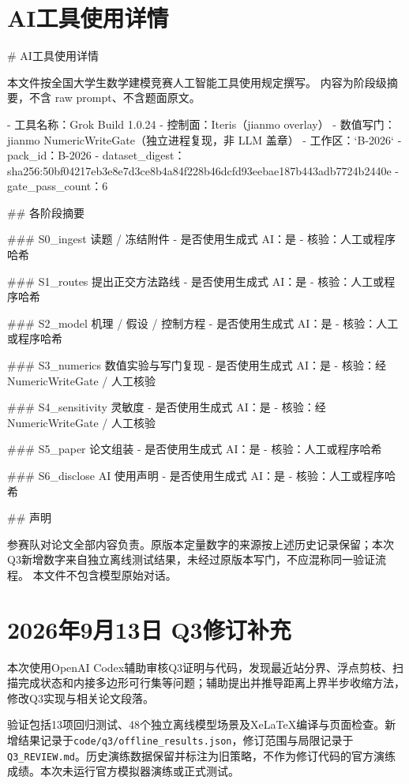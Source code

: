 \documentclass[UTF8]{ctexart}
\begin{document}
\section*{AI工具使用详情}
\# AI工具使用详情

本文件按全国大学生数学建模竞赛人工智能工具使用规定撰写。
内容为阶段级摘要，不含 raw prompt、不含题面原文。

- 工具名称：Grok Build 1.0.24
- 控制面：Iteris（jianmo overlay）
- 数值写门：jianmo NumericWriteGate（独立进程复现，非 LLM 盖章）
- 工作区：`B-2026`
- pack\_id：B-2026
- dataset\_digest：sha256:50bf04217eb3e8e7d3ce8b4a84f228b46dcfd93eebae187b443adb7724b2440e
- gate\_pass\_count：6

\#\# 各阶段摘要

\#\#\# S0\_ingest 读题 / 冻结附件
- 是否使用生成式 AI：是
- 核验：人工或程序哈希

\#\#\# S1\_routes 提出正交方法路线
- 是否使用生成式 AI：是
- 核验：人工或程序哈希

\#\#\# S2\_model 机理 / 假设 / 控制方程
- 是否使用生成式 AI：是
- 核验：人工或程序哈希

\#\#\# S3\_numerics 数值实验与写门复现
- 是否使用生成式 AI：是
- 核验：经 NumericWriteGate / 人工核验

\#\#\# S4\_sensitivity 灵敏度
- 是否使用生成式 AI：是
- 核验：经 NumericWriteGate / 人工核验

\#\#\# S5\_paper 论文组装
- 是否使用生成式 AI：是
- 核验：人工或程序哈希

\#\#\# S6\_disclose AI 使用声明
- 是否使用生成式 AI：是
- 核验：人工或程序哈希

\#\# 声明

参赛队对论文全部内容负责。原版本定量数字的来源按上述历史记录保留；本次Q3新增数字来自独立离线测试结果，未经过原版本写门，不应混称同一验证流程。
本文件不包含模型原始对话。

\section*{2026年9月13日 Q3修订补充}
本次使用OpenAI Codex辅助审核Q3证明与代码，发现最近站分界、浮点剪枝、扫描完成状态和内接多边形可行集等问题；辅助提出并推导距离上界半步收缩方法，修改Q3实现与相关论文段落。

验证包括13项回归测试、48个独立离线模型场景及XeLaTeX编译与页面检查。新增结果记录于\texttt{code/q3/offline\_results.json}，修订范围与局限记录于\texttt{Q3\_REVIEW.md}。历史演练数据保留并标注为旧策略，不作为修订代码的官方演练成绩。本次未运行官方模拟器演练或正式测试。
\end{document}
